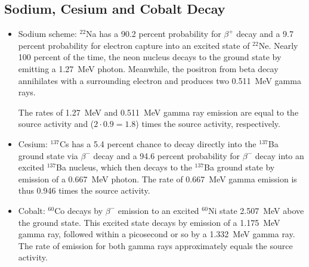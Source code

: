 \documentclass[11pt, a4paper]{article}
\newcommand{\isoptope}[2]{${}^{#2}${#1}}
\begin{document}
\subsection{Sodium, Cesium and Cobalt Decay} \label{spegam:ss:decay-theory}
\begin{itemize}
	\item Sodium scheme: \isoptope{Na}{22} has a 90.2 percent probability for $ \beta^{+} $ decay and a 9.7 percent probability for electron capture into an excited state of \isoptope{Ne}{22}. Nearly 100 percent of the time, the neon nucleus decays to the ground state by emitting a \SI{1.27}{\mega \electronvolt} photon. Meanwhile, the positron from beta decay annihilates with a surrounding electron and produces two \SI{0.511}{\mega \electronvolt} gamma rays.
	
	The rates of \SI{1.27}{\mega \electronvolt} and \SI{0.511}{\mega \electronvolt} gamma ray emission are equal to the source activity and ($ 2 \cdot 0.9 = 1.8 $) times the source activity, respectively.
	
	
	
	\item Cesium: \isoptope{Cs}{137} has a 5.4 percent chance to decay directly into the \isoptope{Ba}{137} ground state via $ \beta^{-} $ decay and a 94.6 percent probability for $ \beta^{-} $ decay into an excited \isoptope{Ba}{137} nucleus, which then decays to the \isoptope{Ba}{137} ground state by emission of a \SI{0.667}{\mega \electronvolt} photon. The rate of \SI{0.667}{\mega \electronvolt} gamma emission is thus 0.946 times the source activity.
	
	
	\item Cobalt: \isoptope{Co}{60} decays by $ \beta^{-} $ emission to an excited \isoptope{Ni}{60} state \SI{2.507}{\mega \electronvolt} above the ground state. This excited state decays by emission of a \SI{1.175}{\mega \electronvolt} gamma ray, followed within a picosecond or so by a \SI{1.332}{\mega \electronvolt} gamma ray. The rate of emission for both gamma rays approximately equals the  source activity.
\end{itemize}
\end{document}
